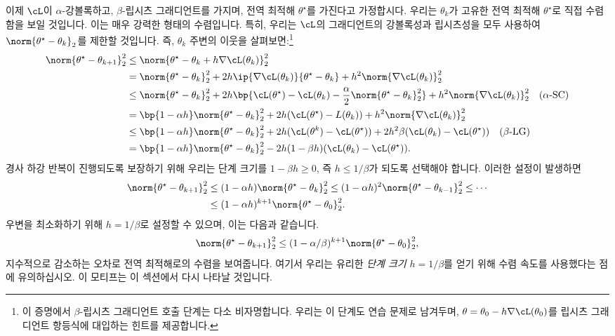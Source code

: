 \documentclass[../../book-main_ko.tex]{subfiles}
\begin{document}
이제 \(\cL\)이 \(\alpha\)-강볼록하고, \(\beta\)-립시츠 그래디언트를 가지며, 전역 최적해 \(\theta^{\star}\)를 가진다고 가정합시다. 우리는 \(\theta_{k}\)가 고유한 전역 최적해 \(\theta^{\star}\)로 직접 수렴함을 보일 것입니다. 이는 매우 강력한 형태의 수렴입니다. 특히, 우리는 \(\cL\)의 그래디언트의 강볼록성과 립시츠성을 모두 사용하여 \(\norm{\theta^{\star} - \theta_{k}}_{2}\)를 제한할 것입니다. 즉, \(\theta_{k}\) 주변의 이웃을 살펴보면:\footnote{이 증명에서 \(\beta\)-립시츠 그래디언트 호출 단계는 다소 비자명합니다. 우리는 이 단계도 연습 문제로 남겨두며, \(\theta = \theta_{0} - h\nabla \cL(\theta_{0})\)를 립시츠 그래디언트 항등식에 대입하는 힌트를 제공합니다.}
\begin{align}
    \norm{\theta^{\star} - \theta_{k + 1}}_{2}^{2}
    &\leq \norm{\theta^{\star} - \theta_{k} + h\nabla \cL(\theta_{k})}_{2}^{2} \\ 
    &= \norm{\theta^{\star} - \theta_{k}}_{2}^{2} + 2h\ip{\nabla \cL(\theta_{k})}{\theta^{\star} - \theta_{k}} + h^{2}\norm{\nabla \cL(\theta_{k})}_{2}^{2} \\ 
    &\leq \norm{\theta^{\star} - \theta_{k}}_{2}^{2} + 2h\bp{\cL(\theta^{\star}) - \cL(\theta_{k}) - \frac{\alpha}{2}\norm{\theta^{\star} - \theta_{k}}_{2}^{2}} + h^{2}\norm{\nabla \cL(\theta_{k})}_{2}^{2} \quad \text{(\(\alpha\)-SC)} \\
    &= \bp{1 - \alpha h}\norm{\theta^{\star} - \theta_{k}}_{2}^{2} + 2h(\cL(\theta^{\star}) - L(\theta_{k})) + h^{2}\norm{\nabla \cL(\theta_{k})}_{2}^{2} \\
    &\leq \bp{1 - \alpha h}\norm{\theta^{\star} - \theta_{k}}_{2}^{2} + 2h(\cL(\theta^{k}) - \cL(\theta^{\star})) + 2h^{2}\beta(\cL(\theta_{k}) - \cL(\theta^{\star})) \quad \text{(\(\beta\)-LG)} \\
    &= \bp{1 - \alpha h}\norm{\theta^{\star} - \theta_{k}}_{2}^{2} - 2h(1 - \beta h)(\cL(\theta_{k}) - \cL(\theta^{\star})).
\end{align}
경사 하강 반복이 진행되도록 보장하기 위해 우리는 단계 크기를 \(1 - \beta h \geq 0\), 즉 \(h \leq 1/\beta\)가 되도록 선택해야 합니다. 이러한 설정이 발생하면
\begin{align}
    \norm{\theta^{\star} - \theta_{k + 1}}_{2}^{2} 
    &\leq (1 - \alpha h)\norm{\theta^{\star} - \theta_{k}}_{2}^{2} \leq (1 - \alpha h)^{2}\norm{\theta^{\star} - \theta_{k - 1}}_{2}^{2} \leq \cdots \\ 
    &\leq (1 - \alpha h)^{k + 1}\norm{\theta^{\star} - \theta_{0}}_{2}^{2}.
\end{align}
우변을 최소화하기 위해 \(h = 1/\beta\)로 설정할 수 있으며, 이는 다음과 같습니다.
\begin{equation}
    \norm{\theta^{\star} - \theta_{k + 1}}_{2}^{2} \leq (1 - \alpha/\beta)^{k + 1}\norm{\theta^{\star} - \theta_{0}}_{2}^{2},
\end{equation}
지수적으로 감소하는 오차로 전역 최적해로의 수렴을 보여줍니다. 여기서 우리는 유리한 \textit{단계 크기} \(h = 1/\beta\)를 얻기 위해 수렴 속도를 사용했다는 점에 유의하십시오. 이 모티프는 이 섹션에서 다시 나타날 것입니다.
\end{document}
